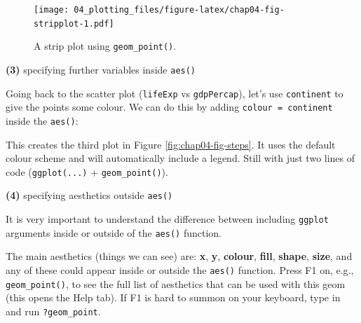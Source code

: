 \documentclass[
  12pt,
  krantz2]{krantz}
\makeatletter
\newenvironment{Shaded}{\begin{snugshade}}{\end{snugshade}}
\newcommand{\DataTypeTok}[1]{\textcolor[rgb]{0.13,0.29,0.53}{#1}}
\newcommand{\KeywordTok}[1]{\textcolor[rgb]{0.13,0.29,0.53}{\textbf{#1}}}
\newcommand{\NormalTok}[1]{#1}
\newcommand{\OperatorTok}[1]{\textcolor[rgb]{0.81,0.36,0.00}{\textbf{#1}}}
\newcommand{\StringTok}[1]{\textcolor[rgb]{0.31,0.60,0.02}{#1}}
\newenvironment{kframe}{%
\medskip{}
\setlength{\fboxsep}{.8em}
 \def\at@end@of@kframe{}%
 \ifinner\ifhmode%
  \def\at@end@of@kframe{\end{minipage}}%
  \begin{minipage}{\columnwidth}%
 \fi\fi%
 \def\FrameCommand##1{\hskip\@totalleftmargin \hskip-\fboxsep
 \colorbox{shadecolor}{##1}\hskip-\fboxsep
     \hskip-\linewidth \hskip-\@totalleftmargin \hskip\columnwidth}%
 \MakeFramed {\advance\hsize-\width
   \@totalleftmargin\z@ \linewidth\hsize
   \@setminipage}}%
 {\par\unskip\endMakeFramed%
 \at@end@of@kframe}
\renewenvironment{Shaded}{\begin{kframe}}{\end{kframe}}
\makeatother
\begin{document}
\begin{Shaded}
\end{Shaded}

\begin{figure}
\centering
\texttt{[image: 04\_plotting\_files/figure-latex/chap04-fig-stripplot-1.pdf]}
\caption{\label{fig:chap04-fig-stripplot}A strip plot using \texttt{geom\_point()}.}
\end{figure}

\textbf{(3)} specifying further variables inside \texttt{aes()}

Going back to the scatter plot (\texttt{lifeExp} vs \texttt{gdpPercap}), let's use \texttt{continent} to give the points some colour.
We can do this by adding \texttt{colour\ =\ continent} inside the \texttt{aes()}:

\begin{Shaded}
\end{Shaded}

This creates the third plot in Figure \ref{fig:chap04-fig-steps}. It uses the default colour scheme and will automatically include a legend.
Still with just two lines of code (\texttt{ggplot(...)} + \texttt{geom\_point()}).

\textbf{(4)} specifying aesthetics outside \texttt{aes()}

It is very important to understand the difference between including \texttt{ggplot} arguments inside or outside of the \texttt{aes()} function.

The main aesthetics (things we can see) are: \textbf{x}, \textbf{y}, \textbf{colour}, \textbf{fill}, \textbf{shape}, \textbf{size}, and any of these could appear inside or outside the \texttt{aes()} function.
Press F1 on, e.g., \texttt{geom\_point()}, to see the full list of aesthetics that can be used with this geom (this opens the Help tab).
If F1 is hard to summon on your keyboard, type in and run \texttt{?geom\_point}.
\end{document}
